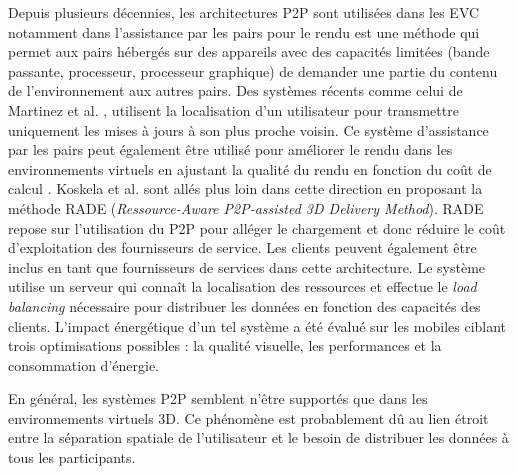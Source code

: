 Depuis plusieurs décennies, les architectures \gls{P2P} sont utilisées dans les 
\gls{EVC} notamment dans l'assistance par les pairs pour le rendu est une 
méthode qui permet aux pairs hébergés sur des appareils avec des capacités 
limitées (bande passante, processeur, processeur graphique) de demander une 
partie du contenu de l'environnement aux autres pairs.
Des systèmes récents comme celui de Martinez et al. \cite{Martinez2009}, 
utilisent la 
localisation d'un utilisateur pour transmettre uniquement les mises à jours à son 
plus 
proche voisin. 
Ce système d'assistance par les pairs peut également être utilisé pour améliorer le 
rendu dans les environnements virtuels en ajustant la qualité du rendu en fonction 
du coût de calcul \cite{Zhu2011}.  
Koskela et al. \cite{Koskela2014} sont allés plus loin dans cette direction en 
proposant la méthode RADE (\textit{Ressource-Aware P2P-assisted 3D Delivery 
	Method}). RADE repose sur l'utilisation du \gls{P2P} pour alléger le chargement 
	et 
donc réduire le coût d'exploitation des fournisseurs de service. Les 
clients peuvent également être inclus en tant que fournisseurs de services dans 
cette architecture. 
Le système utilise un serveur qui connaît la localisation des ressources et 
effectue le \textit{load balancing} nécessaire pour distribuer les données en 
fonction des capacités des clients. L'impact énergétique d'un tel système a été 
évalué sur les mobiles ciblant trois optimisations possibles : la qualité visuelle, les 
performances et la consommation d'énergie. 

En général, les systèmes \gls{P2P} semblent n'être supportés que dans les 
environnements virtuels 3D. Ce phénomène est probablement dû au lien étroit 
entre la séparation spatiale de l'utilisateur et le besoin de distribuer les données à 
tous les participants.
%
%

